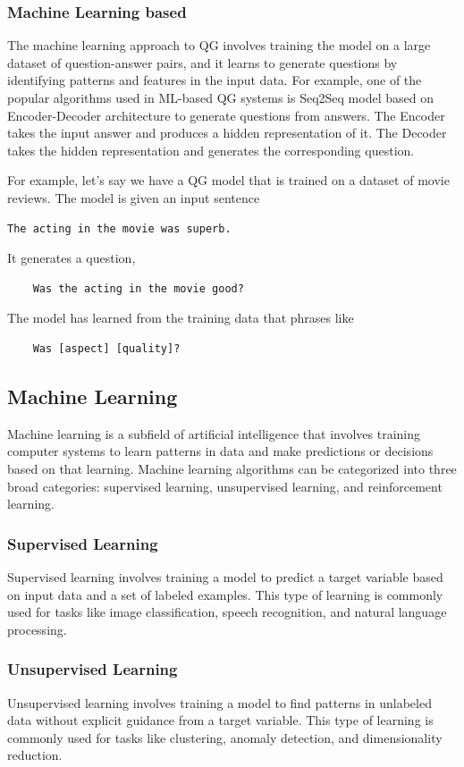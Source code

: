 \documentclass[12pt]{report}
\begin{document}
 \subsubsection{Machine Learning based}
The machine learning approach to QG involves training the model on a large dataset of question-answer pairs, and it learns to generate questions by identifying patterns and features in the input data. For example, one of the popular algorithms used in ML-based QG systems is Seq2Seq model based on Encoder-Decoder architecture to generate questions from answers. The Encoder takes the input answer and produces a hidden representation of it. The Decoder takes the hidden representation and generates the corresponding question. 

For example, let's say we have a QG model that is trained on a dataset of movie reviews. The model is given an input sentence 
\begin{verbatim}
The acting in the movie was superb.
\end{verbatim}
It generates a question, 
\begin{verbatim}
    Was the acting in the movie good?
\end{verbatim}
The model has learned from the training data that phrases like 
\begin{verbatim}
    Was [aspect] [quality]?
\end{verbatim}
 \subsection{Machine Learning}
 Machine learning is a subfield of artificial intelligence that involves training computer systems to learn patterns in data and make predictions or decisions based on that learning. Machine learning algorithms can be categorized into three broad categories: supervised learning, unsupervised learning, and reinforcement learning.
 \subsubsection*{Supervised Learning}
 Supervised learning involves training a model to predict a target variable based on input data and a set of labeled examples. This type of learning is commonly used for tasks like image classification, speech recognition, and natural language processing.
 \subsubsection*{Unsupervised Learning}
 Unsupervised learning involves training a model to find patterns in unlabeled data without explicit guidance from a target variable. This type of learning is commonly used for tasks like clustering, anomaly detection, and dimensionality reduction.
\end{document}
